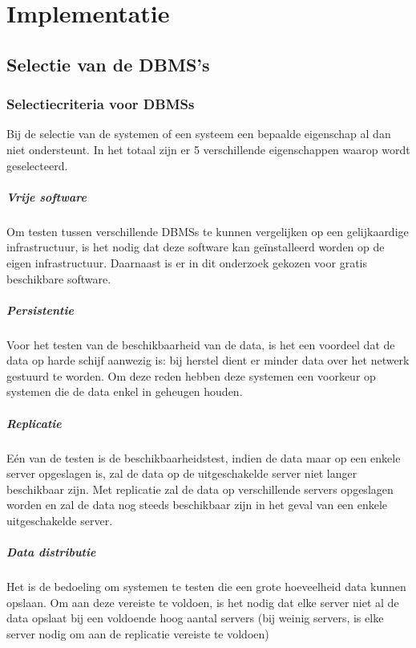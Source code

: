 \chapter{Implementatie}

\section{Selectie van de DBMS's}

\subsection{Selectiecriteria voor \glspl{DBMS}}
Bij de selectie van de systemen of een systeem een bepaalde eigenschap al dan niet ondersteunt. In het totaal zijn er 5 verschillende eigenschappen waarop wordt geselecteerd. 

\paragraph{Vrije software} Om testen tussen verschillende \glspl{DBMS} te kunnen vergelijken op een gelijkaardige infrastructuur, is het nodig dat deze software kan geïnstalleerd worden op de eigen infrastructuur. Daarnaast is er in dit onderzoek gekozen voor gratis beschikbare software. 

\paragraph{Persistentie} Voor het testen van de beschikbaarheid van de data, is het een voordeel dat de data op harde schijf aanwezig is: bij herstel dient er minder data over het netwerk gestuurd te worden. Om deze reden hebben deze systemen een voorkeur op systemen die de data enkel in geheugen houden. 

\paragraph{Replicatie} Eén van de testen is de beschikbaarheidstest, indien de data maar op een enkele server opgeslagen is, zal de data op de uitgeschakelde server niet langer beschikbaar zijn. Met replicatie zal de data op verschillende servers opgeslagen worden en zal de data nog steeds beschikbaar zijn in het geval van een enkele uitgeschakelde server. 

\paragraph{Data distributie} Het is de bedoeling om systemen te testen die een grote hoeveelheid data kunnen opslaan. Om aan deze vereiste te voldoen, is het nodig dat elke server niet al de data opslaat bij een voldoende hoog aantal servers (bij weinig servers, is elke server nodig om aan de replicatie vereiste te voldoen)

